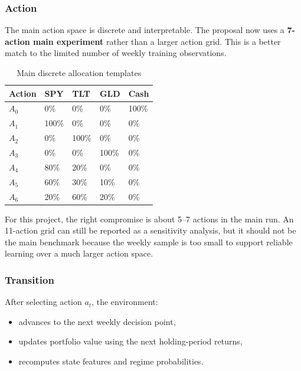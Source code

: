 \documentclass[11pt,a4paper]{article}
\begin{document}
\subsubsection{Action}

The main action space is discrete and interpretable.
The proposal now uses a \textbf{7-action main experiment} rather than a larger action grid.
This is a better match to the limited number of weekly training observations.

\begin{table}[H]
\centering
\caption{Main discrete allocation templates}
\begin{tabular}{@{}lllll@{}}
\toprule
\rowcolor{softgold}
\textbf{Action} & \textbf{SPY} & \textbf{TLT} & \textbf{GLD} & \textbf{Cash} \\
\midrule
$A_0$ & 0\% & 0\% & 0\% & 100\% \\
$A_1$ & 100\% & 0\% & 0\% & 0\% \\
$A_2$ & 0\% & 100\% & 0\% & 0\% \\
$A_3$ & 0\% & 0\% & 100\% & 0\% \\
$A_4$ & 80\% & 20\% & 0\% & 0\% \\
$A_5$ & 60\% & 30\% & 10\% & 0\% \\
$A_6$ & 20\% & 60\% & 20\% & 0\% \\
\bottomrule
\end{tabular}
\end{table}

\begin{insightbox}[title=\textbf{Action Granularity Recommendation}]
For this project, the right compromise is about 5--7 actions in the main run.
An 11-action grid can still be reported as a sensitivity analysis, but it should not be the main benchmark because the weekly sample is too small to support reliable learning over a much larger action space.
\end{insightbox}

\subsubsection{Transition}

After selecting action $a_t$, the environment:

\begin{itemize}[leftmargin=1.4em]
  \item advances to the next weekly decision point,
  \item updates portfolio value using the next holding-period returns,
  \item recomputes state features and regime probabilities.
\end{itemize}
\end{document}
